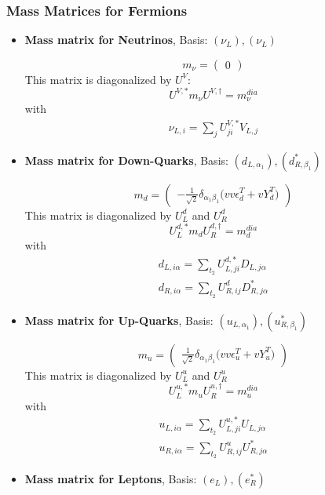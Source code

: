 \subsubsection{Mass Matrices for Fermions}
\begin{itemize} 
\item {\bf Mass matrix for Neutrinos}, Basis: \( \left(\nu_L\right), \left(\nu_L\right) \) 
 
\begin{equation} 
m_{\nu} = \left( 
\begin{array}{c}
0\end{array} 
\right) 
 \end{equation} 
This matrix is diagonalized by \(U^V\): 
\begin{equation} 
U^{V,*} m_{\nu} U^{V,\dagger} = m^{dia}_{\nu} 
\end{equation} 
with 
\begin{align} 
\nu_{L,{i}} = \sum_{j}U^{V,*}_{j i}V_{L,{j}}
\end{align} 
\item {\bf Mass matrix for Down-Quarks}, Basis: \( \left(d_{L,{{\alpha_1}}}\right), \left(d^*_{R,{{\beta_1}}}\right) \) 
 
\begin{equation} 
m_{d} = \left( 
\begin{array}{c}
- \frac{1}{\sqrt{2}} \delta_{{\alpha_1} {\beta_1}} \Big(vv \epsilon_{d}^{T}  + v Y_{d}^{T} \Big)\end{array} 
\right) 
 \end{equation} 
This matrix is diagonalized by \(U^d_L\) and \(U^d_R\) 
\begin{equation} 
U^{d,*}_L m_{d} U_{R}^{d,\dagger} = m^{dia}_{d} 
\end{equation} 
with 
\begin{align} 
d_{L,{i \alpha}} = \sum_{t_2}U^{d,*}_{L,{j i}}D_{L,{j \alpha}}\\ 
d_{R,{i \alpha}} = \sum_{t_2}U_{R,{i j}}^{d}D^*_{R,{j \alpha}}
\end{align} 
\item {\bf Mass matrix for Up-Quarks}, Basis: \( \left(u_{L,{{\alpha_1}}}\right), \left(u^*_{R,{{\beta_1}}}\right) \) 
 
\begin{equation} 
m_{u} = \left( 
\begin{array}{c}
\frac{1}{\sqrt{2}} \delta_{{\alpha_1} {\beta_1}} \Big(vv \epsilon_{u}^{T}  + v Y_{u}^{T} \Big)\end{array} 
\right) 
 \end{equation} 
This matrix is diagonalized by \(U^u_L\) and \(U^u_R\) 
\begin{equation} 
U^{u,*}_L m_{u} U_{R}^{u,\dagger} = m^{dia}_{u} 
\end{equation} 
with 
\begin{align} 
u_{L,{i \alpha}} = \sum_{t_2}U^{u,*}_{L,{j i}}U_{L,{j \alpha}}\\ 
u_{R,{i \alpha}} = \sum_{t_2}U_{R,{i j}}^{u}U^*_{R,{j \alpha}}
\end{align} 
\item {\bf Mass matrix for Leptons}, Basis: \( \left(e_L\right), \left(e_R^*\right) \) 
 

\end{itemize}
